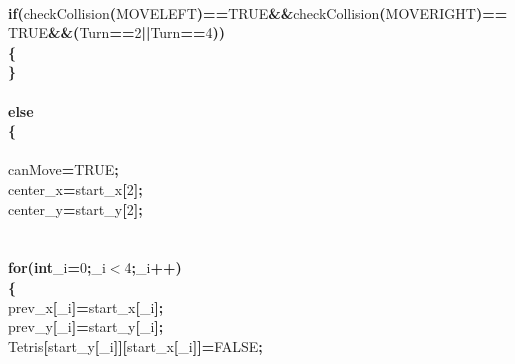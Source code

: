 \documentclass[a4paper, 10pt]{article}
\newcommand\SPC{\hspace*{0.6em}}
\newcommand{\CppAIdentifier}[1]{#1}
\newcommand{\CppANumber}[1]{\textcolor[rgb]{0.5,0,0.5}{#1}}
\newcommand{\CppAReservedWord}[1]{\textbf{#1}}
\newcommand{\CppASpace}[1]{\colorbox[rgb]{1,1,1}{#1}}
\newcommand{\CppASymbol}[1]{\textbf{\textcolor[rgb]{1,0,0}{#1}}}
\begin{document}
\begin{ttfamily}
\\
\CppASpace{\SPC \SPC \SPC }\CppAReservedWord{if}\CppASymbol{(}\CppAIdentifier{checkCollision}\CppASymbol{(}\CppAIdentifier{MOVELEFT}\CppASymbol{)}\CppASymbol{==}\CppAIdentifier{TRUE}\CppASymbol{\&\&}\CppAIdentifier{checkCollision}\CppASymbol{(}\CppAIdentifier{MOVERIGHT}\CppASymbol{)}\CppASymbol{==}\CppAIdentifier{TRUE}\CppASymbol{\&\&}\CppASymbol{(}\CppAIdentifier{Turn}\CppASymbol{==}\CppANumber{2}\CppASymbol{||}\CppAIdentifier{Turn}\CppASymbol{==}\CppANumber{4}\CppASymbol{)}\CppASymbol{)}\\
\CppASpace{\SPC \SPC \SPC }\CppASymbol{\{}\\
\CppASpace{\SPC \SPC \SPC }\CppASymbol{\}}\\
\\
\CppASpace{\SPC \SPC \SPC }\CppAReservedWord{else}\\
\CppASpace{\SPC \SPC \SPC }\CppASymbol{\{}\\
\\
\CppASpace{\SPC \SPC \SPC \SPC }\CppAIdentifier{canMove}\CppASymbol{=}\CppAIdentifier{TRUE}\CppASymbol{;}\\
\CppASpace{\SPC \SPC \SPC \SPC }\CppAIdentifier{center\_x}\CppASymbol{=}\CppAIdentifier{start\_x}\CppASymbol{[}\CppANumber{2}\CppASymbol{]}\CppASymbol{;}\\
\CppASpace{\SPC \SPC \SPC \SPC }\CppAIdentifier{center\_y}\CppASymbol{=}\CppAIdentifier{start\_y}\CppASymbol{[}\CppANumber{2}\CppASymbol{]}\CppASymbol{;}\\
\\
\\
\CppASpace{\SPC \SPC \SPC \SPC }\CppAReservedWord{for}\CppASymbol{(}\CppAReservedWord{int}\CppASpace{\SPC }\CppAIdentifier{\_i}\CppASymbol{=}\CppANumber{0}\CppASymbol{;}\CppAIdentifier{\_i}\CppASymbol{$<$}\CppANumber{4}\CppASymbol{;}\CppAIdentifier{\_i}\CppASymbol{++}\CppASymbol{)}\\
\CppASpace{\SPC \SPC \SPC \SPC }\CppASymbol{\{}\\
\CppASpace{\SPC \SPC \SPC \SPC \SPC }\CppAIdentifier{prev\_x}\CppASymbol{[}\CppAIdentifier{\_i}\CppASymbol{]}\CppASymbol{=}\CppAIdentifier{start\_x}\CppASymbol{[}\CppAIdentifier{\_i}\CppASymbol{]}\CppASymbol{;}\\
\CppASpace{\SPC \SPC \SPC \SPC \SPC }\CppAIdentifier{prev\_y}\CppASymbol{[}\CppAIdentifier{\_i}\CppASymbol{]}\CppASymbol{=}\CppAIdentifier{start\_y}\CppASymbol{[}\CppAIdentifier{\_i}\CppASymbol{]}\CppASymbol{;}\\
\CppASpace{\SPC \SPC \SPC \SPC \SPC }\CppAIdentifier{Tetris}\CppASymbol{[}\CppAIdentifier{start\_y}\CppASymbol{[}\CppAIdentifier{\_i}\CppASymbol{]}\CppASymbol{]}\CppASymbol{[}\CppAIdentifier{start\_x}\CppASymbol{[}\CppAIdentifier{\_i}\CppASymbol{]}\CppASymbol{]}\CppASymbol{=}\CppAIdentifier{FALSE}\CppASymbol{;}\\

\end{ttfamily}
\end{document}
